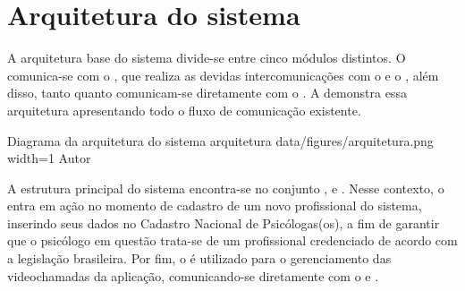 \section{Arquitetura do sistema}
\label{sec:arquitetura}

A arquitetura base do sistema divide-se entre cinco módulos distintos. O  comunica-se com o , que realiza as devidas intercomunicações com o  e o , além disso, tanto  quanto  comunicam-se diretamente com o . A  demonstra essa arquitetura apresentando todo o fluxo de comunicação existente.

\image
    {Diagrama da arquitetura do sistema}
    {arquitetura}
    {data/figures/arquitetura.png}
    {width=1\textwidth}
    {Autor}

A estrutura principal do sistema encontra-se no conjunto ,  e . Nesse contexto, o  entra em ação no momento de cadastro de um novo profissional do sistema, inserindo seus dados no Cadastro Nacional de Psicólogas(os), a fim de garantir que o psicólogo em questão trata-se de um profissional credenciado de acordo com a legislação brasileira. Por fim, o  é utilizado para o gerenciamento das videochamadas da aplicação, comunicando-se diretamente com o  e .
